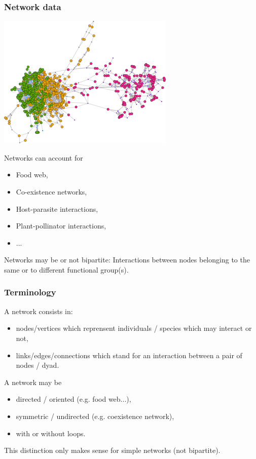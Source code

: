 \documentclass[nopagenumber,9pt]{beamer}
\begin{document}
\begin{frame}
\frametitle{Network data}

\begin{center}
 \includegraphics[scale=.4]{plots/image_SBM.png}
\end{center}


\bigskip


Networks can account for 
\begin{itemize}
\item Food web,
\item Co-existence networks,
\item Host-parasite interactions,
\item Plant-pollinator interactions,
\item ...
\end{itemize}

\bigskip

Networks may be or not bipartite: Interactions between nodes belonging to the same or to different functional group(s).


\end{frame}


\begin{frame}
 \frametitle{Terminology}
 
 A network consists in:
 \begin{itemize}
  \item nodes/vertices which reprensent individuals / species which may interact or not,
  \item links/edges/connections which stand for an interaction between a pair of nodes / dyad.
  
 \end{itemize}

\bigskip
 
 A network may be 
 \begin{itemize}
  \item directed / oriented (e.g. food web...),
  \item symmetric / undirected (e.g. coexistence network),
  \item with or without loops.
 \end{itemize}

This distinction only makes sense for simple networks (not bipartite).
 
 
\end{frame}
\end{document}
